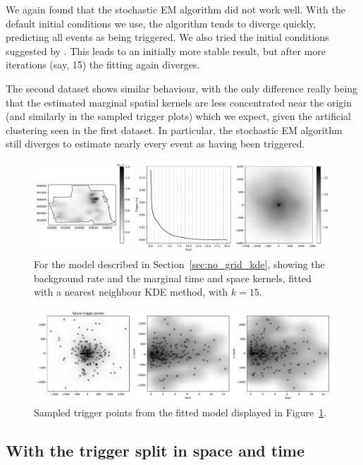 \documentclass[twoside,a4paper]{article}
\theoremstyle{plain}
\theoremstyle{definition}
\begin{document}
We again found that the stochastic EM algorithm did not work well.  With the default
initial conditions we use, the algorithm tends to diverge quickly, predicting all events
as being triggered.  We also tried the initial conditions suggested by \cite{rc}.  This leads
to an initially more stable result, but after more iterations (say, 15) the fitting again
diverges.

The second dataset shows similar behaviour, with the only difference really being that the
estimated marginal spatial kernels are less concentrated near the origin (and similarly
in the sampled trigger plots) which we expect, given the artificial clustering seen in the
first dataset.  In particular, the stochastic EM algorithm still diverges to estimate nearly
every event as having been triggered.

\begin{figure}
  \includegraphics[width=\textwidth]{../notebooks/no_grid_nnkde_1.pdf}
  \caption{For the model described in Section~\ref{sec:no_grid_kde}, showing the background
rate and the marginal time and space kernels, fitted with a nearest neighbour KDE method,
with $k=15$.}
  \label{fig:no_grid_nnkde_1}
\end{figure}

\begin{figure}
  \includegraphics[width=\textwidth]{../notebooks/no_grid_nnkde_1a.pdf}
  \caption{Sampled trigger points from the fitted model displayed in
Figure~\ref{fig:no_grid_nnkde_1}.}
  \label{fig:no_grid_nnkde_1a}
\end{figure}




\subsection{With the trigger split in space and time}
\end{document}
